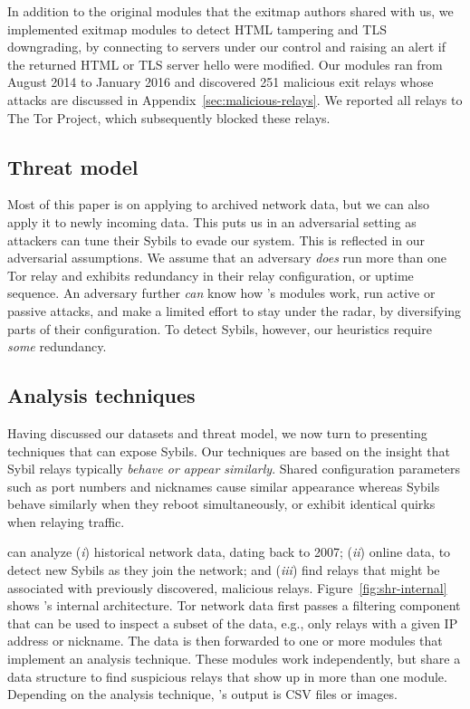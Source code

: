 In addition to the original modules that the exitmap authors shared with us, we
implemented exitmap modules to detect HTML tampering and TLS downgrading, by
connecting to servers under our control and raising an alert if the returned
HTML or TLS server hello were modified.  Our modules ran from August 2014 to
January 2016 and discovered 251 malicious exit relays whose attacks are
discussed in Appendix~\ref{sec:malicious-relays}.  We reported all relays to The
Tor Project, which subsequently blocked these relays.

\subsection{Threat model}
\label{sec:threat_model}
Most of this paper is on applying \sys to archived network data, but we can also
apply it to newly incoming data.  This puts us in an adversarial setting as
attackers can tune their Sybils to evade our system.  This is reflected in our
adversarial assumptions.  We assume that an adversary \emph{does} run more than
one Tor relay and exhibits redundancy in their relay configuration, or uptime
sequence.  An adversary further \emph{can} know how \sys's modules work, run
active or passive attacks, and make a limited effort to stay under the radar, by
diversifying parts of their configuration.  To detect Sybils, however, our
heuristics require \emph{some} redundancy.

\subsection{Analysis techniques}
\label{sec:techniques}
Having discussed our datasets and threat model, we now turn to presenting
techniques that can expose Sybils.  Our techniques are based on the insight that
Sybil relays typically \emph{behave or appear similarly}.  Shared configuration
parameters such as port numbers and nicknames cause similar appearance whereas
Sybils behave similarly when they reboot simultaneously, or exhibit identical
quirks when relaying traffic.

\Sys can analyze (\emph{i}) historical network data, dating back to 2007;
(\emph{ii}) online data, to detect new Sybils as they join the network; and
(\emph{iii}) find relays that might be associated with previously discovered,
malicious relays.  Figure~\ref{fig:shr-internal} shows \sys's internal
architecture.  Tor network data first passes a filtering component that can be
used to inspect a subset of the data, e.g., only relays with a given IP address
or nickname.  The data is then forwarded to one or more modules that implement
an analysis technique.  These modules work independently, but share a data
structure to find suspicious relays that show up in more than one module.
Depending on the analysis technique, \sys's output is CSV files or images.

